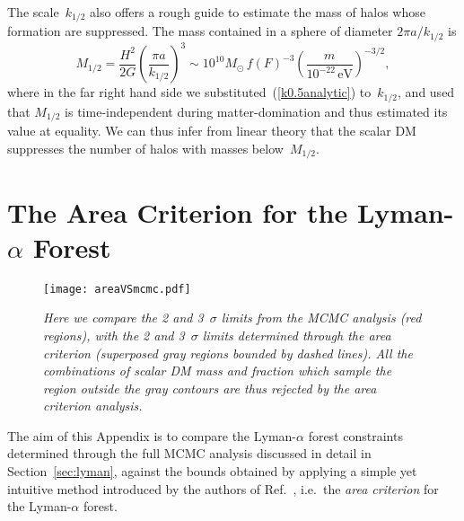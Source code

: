 \documentclass[11pt,nofootinbib]{article}
\numberwithin{equation}{section}
\begin{document}
The scale~$k_{1/2}$ also offers a rough guide to estimate the mass of halos
whose formation are suppressed.
The mass contained in a sphere of diameter $2 \pi a / k_{1/2}$ is
\begin{equation}
 M_{1/2} = \frac{H^2}{2 G} \left( \frac{\pi a}{k_{1/2}} \right)^3
 \sim 10^{10} M_{\odot} \, f(F)^{-3}
  \left( \frac{m}{10^{-22} \, \mathrm{eV}} \right)^{-3/2},
\end{equation}
where in the far right hand side we
substituted~(\ref{k0.5analytic}) to~$k_{1/2}$,
and used that $M_{1/2}$ is time-independent during matter-domination and
thus estimated its value at equality.
We can thus infer from linear theory
that the scalar DM suppresses the number of halos with masses below~$M_{1/2}$.

\section{The Area Criterion for the Lyman-$\alpha$ Forest}
\label{ap:area}

\begin{figure}[t]
  \begin{center}
  \begin{center}
  \texttt{[image: areaVSmcmc.pdf]}
  \end{center}
   \caption{\emph{Here we compare the 2 and 3~$\sigma$ limits from the
   MCMC analysis (red regions), with the 2 and 3~$\sigma$ limits
   determined through the area criterion (superposed gray regions
   bounded by dashed lines). 
   All the combinations of scalar DM mass and fraction which sample the region outside the gray contours are thus rejected by the area criterion analysis.}}
  \label{fig:areaVSmcmc}
  \end{center}
\end{figure}

 The aim of this Appendix is to compare the Lyman-$\alpha$ forest constraints determined through the full MCMC analysis discussed in detail in Section~\ref{sec:lyman}, against the bounds obtained by applying a simple yet intuitive method introduced by the authors of Ref.~\cite{Murgia:2017lwo}, i.e.~the {\emph{area criterion}} for the Lyman-$\alpha$ forest.
\end{document}
